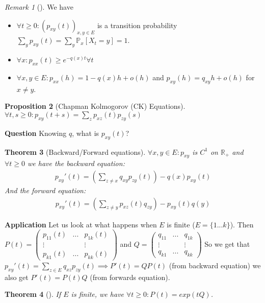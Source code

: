 \documentclass[12pt]{book}
\newtheorem{theorem}{Theorem}[section]
\newtheorem{prop}[theorem]{Proposition}
\theoremstyle{definition}
\theoremstyle{remark}
\newtheorem{rmk}[theorem]{Remark}
\begin{document}
\begin{rmk}[] We have
\begin{itemize}
	\item $\forall t\geq 0: (p_{xy}(t))_{x,y \in E}$ is a transition probability $\sum_{y}^{} p_{xy}(t) = \sum_{y}^{} \mathbb{P}_{x} \left[ X_t=y \right] =1$.
	\item $\forall x: p_{xx}(t) \geq e^{-q(x) t} \forall t$
	\item $\forall x,y \in E: p_{xx}(h) = 1 - q(x)h + o(h)$ and $p_{xy}(h)=q_{xy}h+o(h)$ for $x \neq y$.
\end{itemize}

\end{rmk}

\begin{prop}[Chapman Kolmogorov (CK) Equations]
	$\forall t,s \geq 0: p_{xy}(t+s)=\sum_{z}^{} p_{xz}(t)p_{zy}(s)$	
\end{prop}
\noindent
\textbf{Question} Knowing $q$, what is $p_{xy}(t)$?

\begin{theorem}[Backward/Forward equations]
	$\forall x,y \in E: p_{xy}$ is $C^1$ on $\mathbb{R}_+$ and $\forall t \geq 0$ we have the backward equation:
\begin{align}
 p_{xy}'(t) = \left( \sum_{z \neq x}^{} q_{xy} p_{zy}(t) \right) - q(x) p_{xy}(t)
\end{align}
And the forward equation:
\begin{align}
	 p_{xy}'(t) = \left( \sum_{z \neq y}^{} p_{xz}(t)q_{zy} \right) - p_{xy}(t)q(y)
\end{align}
	
\end{theorem}

\textbf{Application} Let us look at what happens when $E$ is finite ($E = \{1...k\}$). Then $P(t) = 
\begin{pmatrix}
	p_{11}(t) & ... & p_{1k}(t) \\
	\vdots & & \vdots \\
	p_{k1}(t) & ... & p_{k k}(t)
\end{pmatrix}$ 
and $Q = 
\begin{pmatrix}
	q_{11} & ... & q_{1k} \\
	\vdots & & \vdots \\
	q_{k1} & ... & q_{k k }
	
\end{pmatrix}$
So we get that $p_{xy}'(t) = \sum_{z \in E}^{} q_{xz}p_{zy}(t) \implies P'(t) = Q P(t)$ (from backward equation) we also get $P'(t) = P(t)Q$ (from forwards equation).

\begin{theorem}[]
	If $E$ is finite, we have $\forall t\geq 0: P(t) = exp(tQ)$.
\end{theorem}
\end{document}
